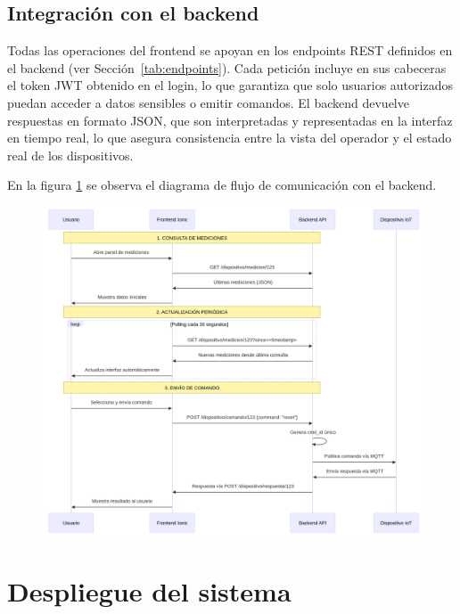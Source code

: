 \subsection{Integración con el backend}

Todas las operaciones del frontend se apoyan en los endpoints REST definidos en el backend (ver Sección~\ref{tab:endpoints}).  
Cada petición incluye en sus cabeceras el token JWT obtenido en el login, lo que garantiza que solo usuarios autorizados puedan acceder a datos sensibles o emitir comandos.  
El backend devuelve respuestas en formato JSON, que son interpretadas y representadas en la interfaz en tiempo real, lo que asegura consistencia entre la vista del operador y el estado real de los dispositivos.

En la figura \ref{fig:diagramaflujorestapi} se observa el diagrama de flujo de comunicación con el backend.

\begin{figure}[H]
 
  \centering
  \includegraphics[width=1.1\linewidth]{./Figures/diagFlujoRestApi.png}
  \label{fig:diagramaflujorestapi}
\end{figure}


\clearpage

\section{Despliegue del sistema}


